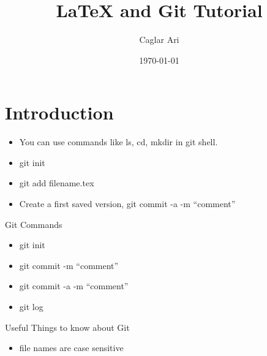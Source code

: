 \documentclass[12pt]{article}
\begin{document}
\title{\LaTeX\; and Git Tutorial}
\author{Caglar Ari}
\date{\today}
\maketitle
{}

\section{Introduction}
\begin{itemize}
\item You can use commands like ls, cd, mkdir in git shell.
\item git init
\item git add filename.tex
\item Create a first saved version, git commit -a -m "`comment"'
\end{itemize}

Git Commands
\begin{itemize}
\item git init
\item git commit -m "`comment"'
\item git commit -a -m "`comment"'
\item git log
\end{itemize}

Useful Things to know about Git
\begin{itemize}
\item file names are case sensitive
\end{itemize}
\end{document}

